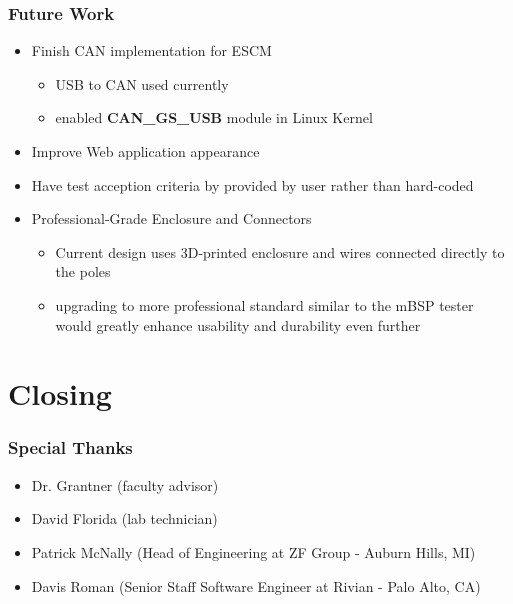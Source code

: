 \documentclass[8pt,compress,aspectratio=169]{beamer}
\newcommand\DarkBoldP[1]{\textcolor{VSPurpleDark}{\textbf{#1}}}
\begin{document}
\begin{frame}
  \frametitle{Future Work}
  \begin{itemize}
    \item Finish CAN implementation for ESCM
      \begin{itemize}
        \item USB to CAN used currently
        \item enabled \DarkBoldP{CAN\_GS\_USB} module in Linux Kernel
      \end{itemize}
    \item Improve Web application appearance
    \item Have test acception criteria by provided by user rather than hard-coded
    \item Professional-Grade Enclosure and Connectors
      \begin{itemize}
        \item Current design uses 3D-printed enclosure and wires connected directly to the poles
        \item	upgrading to more professional standard similar to the mBSP tester would greatly enhance usability and durability even further

      \end{itemize}

  \end{itemize}

\end{frame}

\section{Closing}
\begin{frame}
  \frametitle{Special Thanks}
  \begin{itemize}
    \item Dr. Grantner (faculty advisor)
    \item David Florida (lab technician)
    \item Patrick McNally (Head of Engineering at ZF Group - Auburn Hills, MI)
    \item Davis Roman (Senior Staff Software Engineer at Rivian - Palo Alto, CA)
  \end{itemize}
\end{frame}
\end{document}
